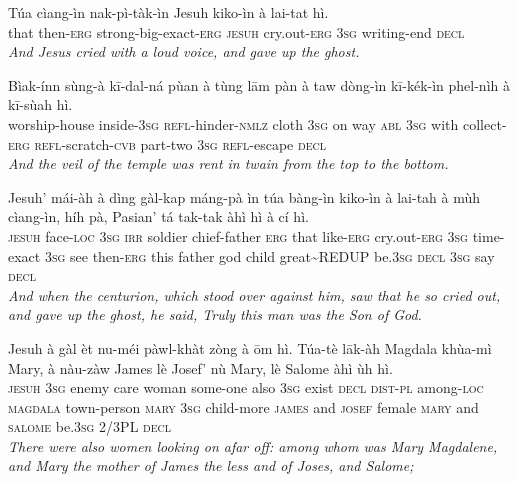 \documentclass[11pt,a4paper]{article}
\begin{document}
\begin{exe}
\gll Túa cìang-ìn nak-pì-tàk-ìn Jesuh kiko-ìn à lai-tat hì. \\
     that then-\textsc{erg} strong-big-exact-\textsc{erg} \textsc{jesuh} cry.out-\textsc{erg} \textsc{3sg} writing-end \textsc{decl} \\
\glt \textcolor{kjvcolor}{\textit{And Jesus cried with a loud voice, and gave up the ghost.}}

\gll Bìak-ínn sùng-à kī-dal-ná pùan à tùng lām pàn à taw dòng-ìn kī-kék-ìn phel-nìh à kī-sùah hì. \\
     worship-house inside-\textsc{3sg} \textsc{refl}-hinder-\textsc{nmlz} cloth \textsc{3sg} on way \textsc{abl} \textsc{3sg} with collect-\textsc{erg} \textsc{refl}-scratch-\textsc{cvb} part-two \textsc{3sg} \textsc{refl}-escape \textsc{decl} \\
\glt \textcolor{kjvcolor}{\textit{And the veil of the temple was rent in twain from the top to the bottom.}}

\gll Jesuh' mái-àh à dìng gàl-kap máng-pà ìn túa bàng-ìn kiko-ìn à lai-tah à mùh cìang-ìn, híh pà, Pasian' tá tak-tak àhì hì à cí hì. \\
     \textsc{jesuh} face-\textsc{loc} \textsc{3sg} \textsc{irr} soldier chief-father \textsc{erg} that like-\textsc{erg} cry.out-\textsc{erg} \textsc{3sg} time-exact \textsc{3sg} see then-\textsc{erg} this father god child great\textasciitilde{}REDUP be.\textsc{3sg} \textsc{decl} \textsc{3sg} say \textsc{decl} \\
\glt \textcolor{kjvcolor}{\textit{And when the centurion, which stood over against him, saw that he so cried out, and gave up the ghost, he said, Truly this man was the Son of God.}}

\gll Jesuh à gàl èt nu-méi pàwl-khàt zòng à ōm hì. Túa-tè lāk-àh Magdala khùa-mì Mary, à nàu-zàw James lè Josef' nù Mary, lè Salome àhì ùh hì. \\
     \textsc{jesuh} \textsc{3sg} enemy care woman some-one also \textsc{3sg} exist \textsc{decl} \textsc{dist}-\textsc{pl} among-\textsc{loc} \textsc{magdala} town-person \textsc{mary} \textsc{3sg} child-more \textsc{james} and \textsc{josef} female \textsc{mary} and \textsc{salome} be.\textsc{3sg} 2/3PL \textsc{decl} \\
\glt \textcolor{kjvcolor}{\textit{There were also women looking on afar off: among whom was Mary Magdalene, and Mary the mother of James the less and of Joses, and Salome;}}


\end{exe}
\end{document}

